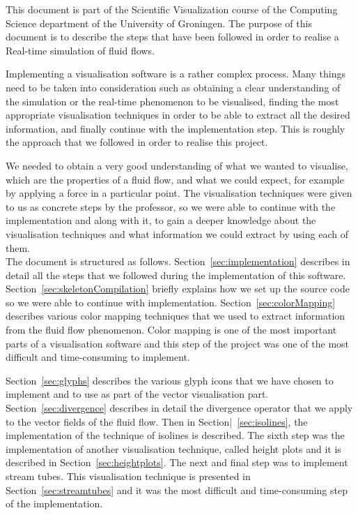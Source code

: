 
This document is part of the Scientific Visualization course of the Computing Science department of the University of Groningen. The purpose of this document is to describe the steps that have been followed in order to realise a Real-time simulation of fluid flows.

Implementing a visualisation software is a rather complex process. Many things need to be taken into consideration such as obtaining a clear understanding of the simulation or the real-time phenomenon to be visualised, finding the most appropriate visualisation techniques in order to be able to extract all the desired information, and finally continue with the implementation step. This is roughly the approach that we followed in order to realise this project.

We needed to obtain a very good understanding of what we wanted to visualise, which are the properties of a fluid flow, and what we could expect, for example by applying a force in a particular point. The visualisation techniques were given to us as concrete steps by the professor, so we were able to continue with the implementation and along with it, to gain a deeper knowledge about the visualisation techniques and what information we could extract by using each of them.\\

The document is structured as follows. Section~\ref{sec:implementation} describes in detail all the steps that we followed during the implementation of this software. Section~\ref{sec:skeletonCompilation} briefly explains how we set up the source code so we were able to continue with implementation. Section~\ref{sec:colorMapping} describes various color mapping techniques that we used to extract information from the fluid flow phenomenon. Color mapping is one of the most important parts of a visualisation software and this step of the project was one of the most difficult and time-consuming to implement.

Section~\ref{sec:glyphs} describes the various glyph icons that we have chosen to implement and to use as part of the vector visualisation part. Section~\ref{sec:divergence} describes in detail the divergence operator that we apply to the vector fields of the fluid flow. Then in Section|~\ref{sec:isolines}, the implementation of the technique of isolines is described. The sixth step was the implementation of another visualisation technique, called height plots and it is described in Section~\ref{sec:heightplots}. The next and final step was to implement stream tubes. This visualisation technique is presented in Section~\ref{sec:streamtubes} and  it was the most difficult and time-consuming step of the implementation.